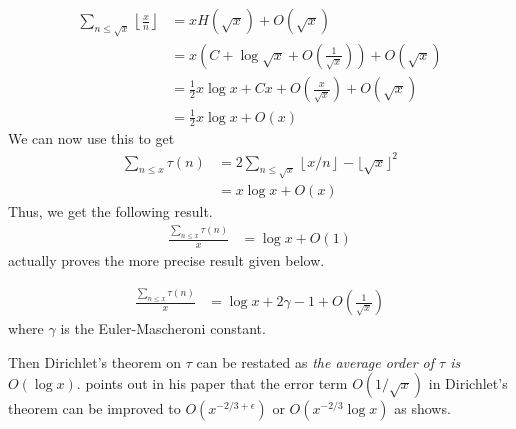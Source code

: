 \documentclass[elemannt.tex]{subfile}
\begin{document}
		\begin{align*}
			\sum_{n\leq \sqrt{x}}\left\lfloor{\frac{x}{n}}\right\rfloor
				& = xH(\sqrt{x})+O(\sqrt{x})\\
				& = x\left(C+\log{\sqrt{x}}+O\left(\frac{1}{\sqrt{x}}\right)\right)+O(\sqrt{x})\\
				& = \frac{1}{2}x\log{x}+Cx+O\left(\frac{x}{\sqrt{x}}\right)+O(\sqrt{x})\\
				& = \frac{1}{2}x\log{x}+O(x)
		\end{align*}
	We can now use this to get
		\begin{align*}
			\sum_{n\leq x}\tau(n)
				& = 2\sum_{n\leq \sqrt{x}}\left\lfloor{x/n}\right\rfloor-\lfloor{\sqrt{x}}\rfloor^{2}\\
				& = x\log{x}+O(x)
		\end{align*}
	Thus, we get the following result.
		\begin{align*}
			\frac{\sum_{n\leq x}\tau(n)}{x}
				& = \log{x}+O(1)
		\end{align*}
	\textcite{dirichlet_1897} actually proves the more precise result given below.
		\begin{theorem}\label{thm:dirtau}
				\begin{align*}
					\frac{\sum_{n\leq x}\tau(n)}{x}
						& = \log{x}+2\gamma-1+O\left(\frac{1}{\sqrt{x}}\right)
				\end{align*}
			where $\gamma$ is the Euler-Mascheroni constant.
		\end{theorem}
	Then Dirichlet's theorem on $\tau$ can be restated as \textit{the average order of $\tau$ is }$O(\log{x})$. \textcite{aiyangar_hardy_vennkatesvara_seshu_aiyar_p_wilson_1927} points out in his paper that the error term $O(1/\sqrt{x})$ in Dirichlet's theorem can be improved to $O\left(x^{-2/3+\epsilon}\right)$ or $O\left(x^{-2/3}\log{x}\right)$ as \textcite[Page $689$]{landau_1912} shows.
\end{document}
